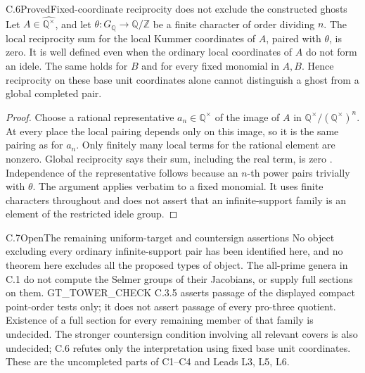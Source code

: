 \begin{result}{C.6}{Proved}{Fixed-coordinate reciprocity does not exclude the constructed ghosts}
Let \(A\in\widehat{\mathbb Q^\times}\), and let
\(\theta:G_{\mathbb Q}\to\mathbb Q/\mathbb Z\) be a finite
character of order dividing \(n\). The local reciprocity sum for the
local Kummer coordinates of \(A\), paired with \(\theta\), is zero.
It is well defined even when the ordinary local coordinates of \(A\)
do not form an idele. The same holds for \(B\) and for every fixed
monomial in \(A,B\). Hence reciprocity on these base unit coordinates
alone cannot distinguish a ghost from a global completed pair.
\end{result}
\begin{proof}
Choose a rational representative \(a_n\in\mathbb Q^\times\) of
the image of \(A\) in \(\mathbb Q^\times/(\mathbb Q^\times)^n\).
At every place the local pairing depends only on this image, so it is
the same pairing as for \(a_n\). Only finitely many local terms for
the rational element are nonzero. Global reciprocity says their sum,
including the real term, is zero
\citep[VII, Theorem 8.1, p.~221]{RootMilneCFT}. Independence of the representative
follows because an \(n\)-th power pairs trivially with \(\theta\).
The argument applies verbatim to a fixed monomial. It uses finite
characters throughout and does not assert that an infinite-support
family is an element of the restricted idele group.
\end{proof}

\begin{result}{C.7}{Open}{The remaining uniform-target and countersign assertions}
No object excluding every ordinary infinite-support pair has been
identified here, and no theorem here excludes all the proposed types of
object. The all-prime genera in C.1 do not compute the Selmer groups of
their Jacobians, or supply full sections on them. GT\_TOWER\_CHECK
C.3.5 asserts passage of the displayed compact point-order tests only;
it does not assert passage of every pro-three quotient. Existence of a
full section for every remaining member of that family is undecided.
The stronger countersign condition involving all relevant covers is
also undecided; C.6 refutes only the interpretation using fixed base
unit coordinates. These are the uncompleted parts of C1--C4 and
Leads L3, L5, L6.
\end{result}

